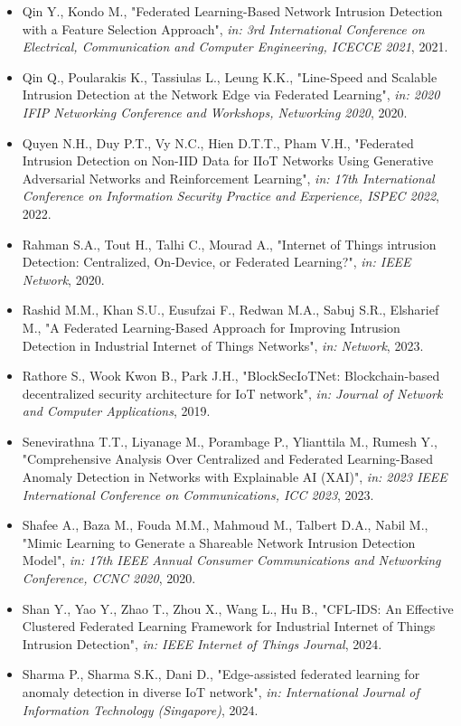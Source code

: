 \begin{itemize}
  \item Qin Y., Kondo M., "Federated Learning-Based Network Intrusion Detection with a Feature Selection Approach", \textit{in: 3rd International Conference on Electrical, Communication and Computer Engineering, ICECCE 2021}, 2021.
  \item Qin Q., Poularakis K., Tassiulas L., Leung K.K., "Line-Speed and Scalable Intrusion Detection at the Network Edge via Federated Learning", \textit{in: 2020 IFIP Networking Conference and Workshops, Networking 2020}, 2020.
  \item Quyen N.H., Duy P.T., Vy N.C., Hien D.T.T., Pham V.H., "Federated Intrusion Detection on Non-IID Data for IIoT Networks Using Generative Adversarial Networks and Reinforcement Learning", \textit{in: 17th International Conference on Information Security Practice and Experience, ISPEC 2022}, 2022.
  \item Rahman S.A., Tout H., Talhi C., Mourad A., "Internet of Things intrusion Detection: Centralized, On-Device, or Federated Learning?", \textit{in: IEEE Network}, 2020.
  \item Rashid M.M., Khan S.U., Eusufzai F., Redwan M.A., Sabuj S.R., Elsharief M., "A Federated Learning-Based Approach for Improving Intrusion Detection in Industrial Internet of Things Networks", \textit{in: Network}, 2023.
  \item Rathore S., Wook Kwon B., Park J.H., "BlockSecIoTNet: Blockchain-based decentralized security architecture for IoT network", \textit{in: Journal of Network and Computer Applications}, 2019.
  \item Senevirathna T.T., Liyanage M., Porambage P., Ylianttila M., Rumesh Y., "Comprehensive Analysis Over Centralized and Federated Learning-Based Anomaly Detection in Networks with Explainable AI (XAI)", \textit{in: 2023 IEEE International Conference on Communications, ICC 2023}, 2023.
  \item Shafee A., Baza M., Fouda M.M., Mahmoud M., Talbert D.A., Nabil M., "Mimic Learning to Generate a Shareable Network Intrusion Detection Model", \textit{in: 17th IEEE Annual Consumer Communications and Networking Conference, CCNC 2020}, 2020.
  \item Shan Y., Yao Y., Zhao T., Zhou X., Wang L., Hu B., "CFL-IDS: An Effective Clustered Federated Learning Framework for Industrial Internet of Things Intrusion Detection", \textit{in: IEEE Internet of Things Journal}, 2024.
  \item Sharma P., Sharma S.K., Dani D., "Edge-assisted federated learning for anomaly detection in diverse IoT network", \textit{in: International Journal of Information Technology (Singapore)}, 2024.

\end{itemize}
